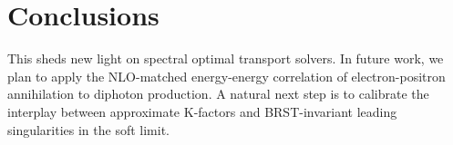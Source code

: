 \section{Conclusions}\label{sec:conclusions}

This sheds new light on spectral optimal transport solvers. In future
work, we plan to apply the NLO-matched energy-energy correlation of
electron-positron annihilation to diphoton production. A natural next
step is to calibrate the interplay between approximate K-factors and
BRST-invariant leading singularities in the soft limit.

